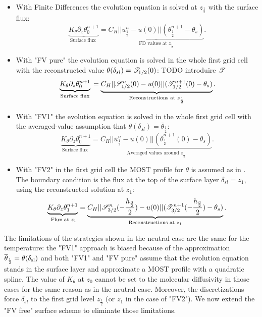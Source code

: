 \begin{itemize}
	\item With Finite Differences the evolution equation is
		solved at $z_{\frac{1}{2}}$ with the surface flux:
		\begin{equation}
			\underbrace{K_\theta
			\partial_z \theta_0^{n+1}}_{\text{
				Surface flux
			}} =
			\underbrace{C_H||u^n_{\frac{1}{2}}- u(0)||
			(\theta_{\frac{1}{2}}^{n+1}
			- \theta_s)}_{\text{FD values at }
			z_{\frac{1}{2}}}.
		\end{equation}
	\item With "FV pure" the evolution equation is solved in 
		the whole first grid cell with the reconstructed
		value $\theta(\delta_{sl}) = {\cal T}_{1/2}(0)$:
		{\color{red} TODO introduire ${\cal T}$}
		\begin{equation}
			\underbrace{K_\theta
			\partial_z \theta_0^{n+1}}_{\text{
				Surface flux
			}} =
			\underbrace{C_H
			||{\cal S}_{1/2}^{n}(0)- u(0)||
			({\cal T}_{1/2}^{n+1}(0)
			- \theta_s)}_{\text{Reconstructions at }
			z_{\frac{1}{2}}}.
		\end{equation}
	\item With "FV1" the evolution equation is solved in
		the whole first grid cell with the averaged-value
		assumption that $\theta(\delta_{sl}) =
		\overline{\theta}_{\frac{1}{2}}$:
		\begin{equation}
			\underbrace{K_\theta
			\partial_z \theta_0^{n+1}}_{\text{
				Surface flux
			}} =
			\underbrace{C_H
			||\overline{u}_{\frac{1}{2}}^n- u(0)||
			(\overline{\theta}_{\frac{1}{2}}^{n+1}(0)
			- \theta_s)}_{\text{Averaged values around }
			z_{\frac{1}{2}}}.
		\end{equation}
	\item With "FV2" in the first grid cell
		the MOST profile for $\theta$ is assumed as in
		\cite{nishizawa_surface_2018}.
		The boundary condition is the flux at the top of the
		surface layer $\delta_{sl}=z_1$,
		using the reconstructed solution at $z_1$:
		\begin{equation}
			\underbrace{K_\theta
			\partial_z \theta^{n+1}_1}_{\text{
				Flux at
			} z_1} =
			\underbrace{C_H
			||{\cal S}_{3/2}^{n}(-\frac{h_\frac{3}{2}}{2})
			- u(0)||
			({\cal T}_{3/2}^{n+1}
			(-\frac{h_\frac{3}{2}}{2})
			- \theta_s)}_{\text{Reconstructions at }
			z_{1}}.
		\end{equation}
\end{itemize}
The limitations of the strategies shown in the neutral case are the
same for the temperature: the "FV1" approach is biased because
of the approximation
$\overline{\theta}_{\frac{1}{2}}=\theta(\delta_{\rm sl})$ and
both "FV1" and "FV pure" assume that the evolution equation stands
in the surface layer and approximate a MOST profile with
a quadratic spline.
The value of $K_\theta$ at $z_0$ cannot be set to the molecular
diffusivity in those cases for the same reason as in the neutral case.
%
Moreover, the discretizations force $\delta_{sl}$ to the first
grid level $z_{\frac{1}{2}}$ (or $z_1$ in the case of "FV2").
We now extend the "FV free" surface scheme to eliminate those
limitations.
